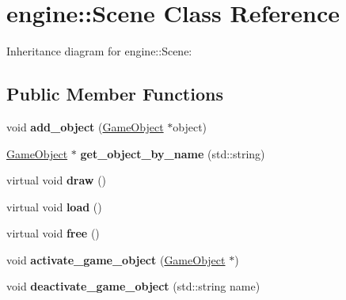 \hypertarget{classengine_1_1_scene}{}\section{engine\+:\+:Scene Class Reference}
\label{classengine_1_1_scene}


Inheritance diagram for engine\+:\+:Scene\+:
\subsection*{Public Member Functions}
\begin{DoxyCompactItemize}
\item 
void {\bfseries add\+\_\+object} (\hyperlink{classengine_1_1_game_object}{Game\+Object} $\ast$object)\hypertarget{classengine_1_1_scene_a1d7c1960d764159416a5eb332d0d2203}{}\label{classengine_1_1_scene_a1d7c1960d764159416a5eb332d0d2203}

\item 
\hyperlink{classengine_1_1_game_object}{Game\+Object} $\ast$ {\bfseries get\+\_\+object\+\_\+by\+\_\+name} (std\+::string)\hypertarget{classengine_1_1_scene_a565ca4778b3c81ac6b3434820d0a4cfa}{}\label{classengine_1_1_scene_a565ca4778b3c81ac6b3434820d0a4cfa}

\item 
virtual void {\bfseries draw} ()\hypertarget{classengine_1_1_scene_a257bc5515bb3e5af364fee377c431271}{}\label{classengine_1_1_scene_a257bc5515bb3e5af364fee377c431271}

\item 
virtual void {\bfseries load} ()\hypertarget{classengine_1_1_scene_a1e46b23b6ef624d2b1107804085a9c96}{}\label{classengine_1_1_scene_a1e46b23b6ef624d2b1107804085a9c96}

\item 
virtual void {\bfseries free} ()\hypertarget{classengine_1_1_scene_a9ca5afc4c001e68939b61b4671e240fa}{}\label{classengine_1_1_scene_a9ca5afc4c001e68939b61b4671e240fa}

\item 
void {\bfseries activate\+\_\+game\+\_\+object} (\hyperlink{classengine_1_1_game_object}{Game\+Object} $\ast$)\hypertarget{classengine_1_1_scene_af63b3b770464494c0cdb56a7a13b50fb}{}\label{classengine_1_1_scene_af63b3b770464494c0cdb56a7a13b50fb}

\item 
void {\bfseries deactivate\+\_\+game\+\_\+object} (std\+::string name)\hypertarget{classengine_1_1_scene_af9c8a6de10c3d49300183f68cefadb39}{}\label{classengine_1_1_scene_af9c8a6de10c3d49300183f68cefadb39}


\end{DoxyCompactItemize}

